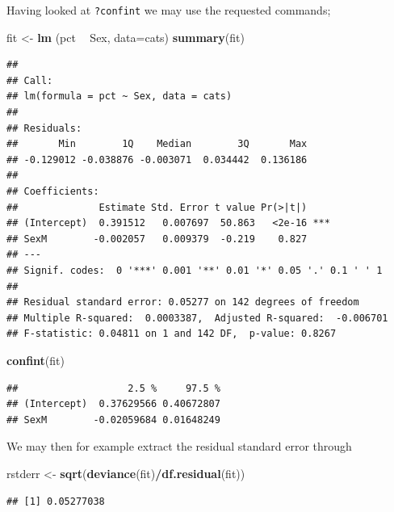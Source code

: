\documentclass[
]{article}
\newenvironment{Shaded}{\begin{snugshade}}{\end{snugshade}}
\newcommand{\DataTypeTok}[1]{\textcolor[rgb]{0.13,0.29,0.53}{#1}}
\newcommand{\KeywordTok}[1]{\textcolor[rgb]{0.13,0.29,0.53}{\textbf{#1}}}
\newcommand{\NormalTok}[1]{#1}
\newcommand{\OperatorTok}[1]{\textcolor[rgb]{0.81,0.36,0.00}{\textbf{#1}}}
\newcommand{\StringTok}[1]{\textcolor[rgb]{0.31,0.60,0.02}{#1}}
\begin{document}
Having looked at \texttt{?confint} we may use the requested commands;

\begin{Shaded}
\begin{Highlighting}[]
\NormalTok{fit <-}\StringTok{ }\KeywordTok{lm}\NormalTok{ (pct }\OperatorTok{~}\StringTok{ }\NormalTok{Sex, }\DataTypeTok{data=}\NormalTok{cats)}
\KeywordTok{summary}\NormalTok{(fit)}
\end{Highlighting}
\end{Shaded}

\begin{verbatim}
## 
## Call:
## lm(formula = pct ~ Sex, data = cats)
## 
## Residuals:
##       Min        1Q    Median        3Q       Max 
## -0.129012 -0.038876 -0.003071  0.034442  0.136186 
## 
## Coefficients:
##              Estimate Std. Error t value Pr(>|t|)    
## (Intercept)  0.391512   0.007697  50.863   <2e-16 ***
## SexM        -0.002057   0.009379  -0.219    0.827    
## ---
## Signif. codes:  0 '***' 0.001 '**' 0.01 '*' 0.05 '.' 0.1 ' ' 1
## 
## Residual standard error: 0.05277 on 142 degrees of freedom
## Multiple R-squared:  0.0003387,  Adjusted R-squared:  -0.006701 
## F-statistic: 0.04811 on 1 and 142 DF,  p-value: 0.8267
\end{verbatim}

\begin{Shaded}
\begin{Highlighting}[]
\KeywordTok{confint}\NormalTok{(fit)}
\end{Highlighting}
\end{Shaded}

\begin{verbatim}
##                   2.5 %     97.5 %
## (Intercept)  0.37629566 0.40672807
## SexM        -0.02059684 0.01648249
\end{verbatim}

We may then for example extract the residual standard error through

\begin{Shaded}
\begin{Highlighting}[]
\NormalTok{rstderr <-}\StringTok{ }\KeywordTok{sqrt}\NormalTok{(}\KeywordTok{deviance}\NormalTok{(fit)}\OperatorTok{/}\KeywordTok{df.residual}\NormalTok{(fit))}
\end{Highlighting}
\end{Shaded}

\begin{verbatim}
## [1] 0.05277038
\end{verbatim}
\end{document}
